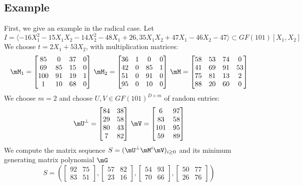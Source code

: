 \documentclass[12pt]{article}
\begin{document}
\subsection{Example}
First, we give an example in the radical case. Let
$$I = \langle -16X_1^2 - 15X_1X_2 - 14X_2^2 - 48X_1 + 26, 35X_1X_2 + 47X_1 - 46X_2 - 47 \rangle \subset GF(101)[X_1,X_2]$$
We choose $t = 2X_1 + 53 X_2$, with multiplication matrices:
\begin{align*}
\mM_1 = \begin{bmatrix}
 85&   0&  37&   0\\
 69&  85&  15&   0\\
100&  91&  19&   1\\
  1&  10&  68&   0
\end{bmatrix}\,
\mM_2 = \begin{bmatrix}
36&  1&  0&  0\\
42&  0& 85&  1\\
51&  0& 91&  0\\
95&  0& 10&  0
\end{bmatrix}\,
\mM = \begin{bmatrix}
58& 53& 74&  0\\
41& 69& 91& 53\\
75& 81& 13&  2\\
88& 20& 60&  0
\end{bmatrix}
\end{align*}
We choose $m = 2$ and choose $U,V \in GF(101)^{D\times m}$ of random
entries:
$$ \mU^{\perp} = \begin{bmatrix}
84& 38\\
29& 58\\
80& 43\\
 7& 82
\end{bmatrix}\,
\mV = \begin{bmatrix}
  6&  97\\
 83&  58\\
101&  95\\
 59&  89
\end{bmatrix}
$$
We compute the matrix sequence $S = (\mU^{\perp}\mM^i\mV)_{i\ge0}$ and its minimum generating matrix polynomial $\mG$
$$ S = (
\begin{bmatrix}
92& 75\\  
83& 51
\end{bmatrix},
\begin{bmatrix}
57& 82\\  
23& 16
\end{bmatrix},
\begin{bmatrix}
54& 93\\  
70& 66
\end{bmatrix},
\begin{bmatrix}
50& 77\\
26& 76
\end{bmatrix}
)$$
\end{document}
